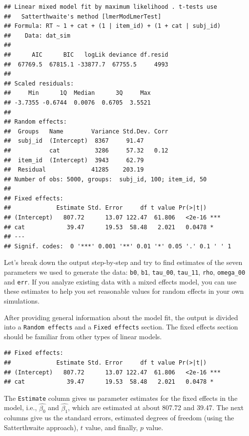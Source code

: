 \documentclass[doc,floatsintext]{apa6}
\begin{document}
\begin{verbatim}
## Linear mixed model fit by maximum likelihood . t-tests use
##   Satterthwaite's method [lmerModLmerTest]
## Formula: RT ~ 1 + cat + (1 | item_id) + (1 + cat | subj_id)
##    Data: dat_sim
## 
##      AIC      BIC   logLik deviance df.resid 
##  67769.5  67815.1 -33877.7  67755.5     4993 
## 
## Scaled residuals: 
##     Min      1Q  Median      3Q     Max 
## -3.7355 -0.6744  0.0076  0.6705  3.5521 
## 
## Random effects:
##  Groups   Name        Variance Std.Dev. Corr
##  subj_id  (Intercept)  8367     91.47       
##           cat          3286     57.32   0.12
##  item_id  (Intercept)  3943     62.79       
##  Residual             41285    203.19       
## Number of obs: 5000, groups:  subj_id, 100; item_id, 50
## 
## Fixed effects:
##             Estimate Std. Error     df t value Pr(>|t|)    
## (Intercept)   807.72      13.07 122.47  61.806   <2e-16 ***
## cat            39.47      19.53  58.48   2.021   0.0478 *  
## ---
## Signif. codes:  0 '***' 0.001 '**' 0.01 '*' 0.05 '.' 0.1 ' ' 1
\end{verbatim}

\noindent Let's break down the output step-by-step and try to find
estimates of the seven parameters we used to generate the data:
\texttt{b0}, \texttt{b1}, \texttt{tau\_00}, \texttt{tau\_11},
\texttt{rho}, \texttt{omega\_00} and \texttt{err}. If you analyze
existing data with a mixed effects model, you can use these estimates to
help you set reasonable values for random effects in your own
simulations.

After providing general information about the model fit, the output is
divided into a \texttt{Random\ effects} and a \texttt{Fixed\ effects}
section. The fixed effects section should be familiar from other types
of linear models.

\begin{verbatim}
## Fixed effects:
##             Estimate Std. Error     df t value Pr(>|t|)    
## (Intercept)   807.72      13.07 122.47  61.806   <2e-16 ***
## cat            39.47      19.53  58.48   2.021   0.0478 *
\end{verbatim}

\noindent The \texttt{Estimate} column gives us parameter estimates for
the fixed effects in the model, i.e., \(\hat{\beta_0}\) and
\(\hat{\beta_1}\), which are estimated at about 807.72 and 39.47. The
next columns give us the standard errors, estimated degrees of freedom
(using the Satterthwaite approach), \(t\) value, and finally, \(p\)
value.
\end{document}

